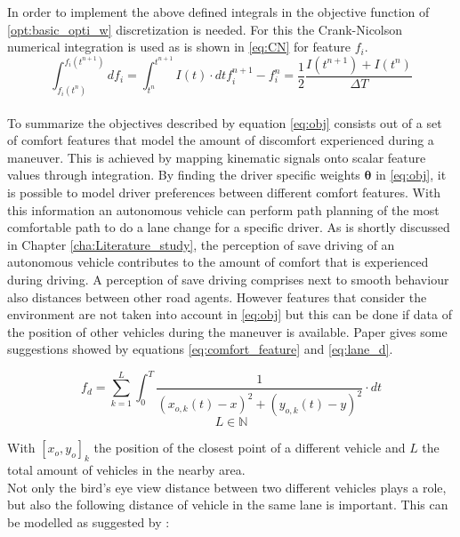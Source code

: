 In order to implement the above defined integrals in the objective function of \ref{opt:basic_opti_w} discretization is needed. For this the Crank-Nicolson numerical integration is used as is shown in \ref{eq:CN} for feature $f_i$. 
\begin{subequations}\label{eq:CN}
	\begin{equation}
	\int_{f_i(t^n)}^{f_i(t^{n+1})}df_i=\int_{t^n}^{t^{n+1}} I(t) \cdot dt	
	\end{equation}
	\begin{equation}
	f_i^{n+1} -f_i^{n} = \frac{1}{2}\frac{I(t^{n+1})+I(t^n)}{\Delta T}
	\end{equation}
\end{subequations}\\

To summarize the objectives described by equation \ref{eq:obj} consists out of a set of comfort features that model the amount of discomfort experienced during a maneuver. This is achieved by mapping kinematic signals onto scalar feature values through integration. By finding the driver specific weights $\bm{\theta}$ in \ref{eq:obj}, it is possible to model driver preferences between different comfort features. With this information an autonomous vehicle can perform path planning of the most comfortable path to do a lane change for a specific driver. As is shortly discussed in Chapter \ref{cha:Literature_study}, the perception of save driving of an autonomous vehicle contributes to the amount of comfort that is experienced during driving. A perception of save driving comprises next to smooth behaviour also distances between other road agents. However features that consider the environment are not taken into account in \ref{eq:obj} but this can be done if data of the position of other vehicles during the maneuver is available. Paper \cite{Kuderer2015a} gives some suggestions showed by equations \ref{eq:comfort_feature} and  \ref{eq:lane_d}.  

\begin{equation}\label{eq:comfort_feature}
f_d= \sum_{k = 1}^{L}\int_{0}^{T}\frac{1}{(x_{o,k}(t)-x)^2+(y_{o,k}(t)-y)^2}\cdot dt
\end{equation}
\[L \in \mathbb{N}\]

With $[x_o,y_o]_k$ the position of the closest point of a different vehicle and $L$ the total amount of vehicles in the nearby area.\\

Not only the bird's eye view distance between two different vehicles plays a role, but also the following distance of vehicle in the same lane is important. This can be modelled as suggested by \cite{Kuderer2015a}:  

